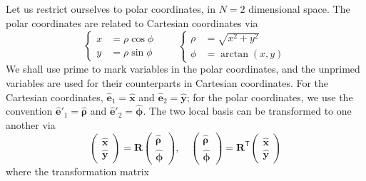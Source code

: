 \documentclass[a4paper, 11pt]{article}
\begin{document}
Let us restrict ourselves to polar coordinates, in $N=2$ dimensional space. The polar coordinates are related to Cartesian coordinates via
\begin{equation}\label{eqn:polar-convert}
    \left\{\begin{aligned}
        x &= \rho \cos\phi \\ 
        y &= \rho \sin\phi
    \end{aligned}\right.\qquad 
    \left\{\begin{aligned}
        \rho &= \sqrt{x^2 + y^2} \\ 
        \phi &= \arctan \left(x, y\right)
    \end{aligned}\right.
\end{equation}
We shall use prime to mark variables in the polar coordinates, and the unprimed variables are used for their counterparts in Cartesian coordinates. For the Cartesian coordinates, $\hat{\mathbf{e}}_1 = \hat{\mathbf{x}}$ and $\hat{\mathbf{e}}_2 = \hat{\mathbf{y}}$; for the polar coordinates, we use the convention $\hat{\mathbf{e}}'_1 = \hat{\bm{\rho}}$ and $\hat{\mathbf{e}}'_2 = \hat{\bm{\phi}}$. The two local basis can be transformed to one another via
\begin{equation}
    \begin{pmatrix}
        \hat{\mathbf{x}} \\ \hat{\mathbf{y}}
    \end{pmatrix} = \mathbf{R}
    \begin{pmatrix}
        \hat{\bm{\rho}} \\ \hat{\bm{\phi}}
    \end{pmatrix},\quad 
    \begin{pmatrix}
        \hat{\bm{\rho}} \\ \hat{\bm{\phi}}
    \end{pmatrix} = \mathbf{R}^{\mathsf{T}}
    \begin{pmatrix}
        \hat{\mathbf{x}} \\ \hat{\mathbf{y}}
    \end{pmatrix}
\end{equation}
where the transformation matrix
\end{document}
